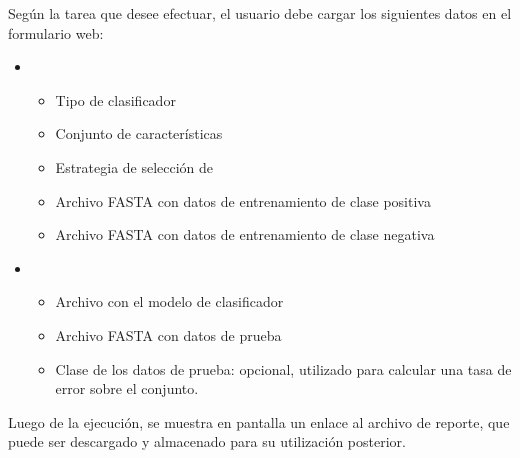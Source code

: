 Según la tarea que desee efectuar, el usuario debe cargar los
siguientes datos en el formulario web:
%
\begin{itemize}
\item
  \begin{itemize}
  \item
    Tipo de clasificador
  \item
    Conjunto de características
  \item
    Estrategia de selección de 
  \item
    Archivo FASTA con datos de entrenamiento de clase positiva
  \item
    Archivo FASTA con datos de entrenamiento de clase negativa
  \end{itemize}
\item
  \begin{itemize}
  \item
    Archivo con el modelo de clasificador
  \item
    Archivo FASTA con datos de prueba
  \item
    Clase de los datos de prueba: opcional, utilizado para calcular
    una tasa de error sobre el conjunto.
  \end{itemize}
\end{itemize}
%
Luego de la ejecución, se muestra en pantalla un enlace al archivo de
reporte, que puede ser descargado y almacenado para su utilización
posterior.

